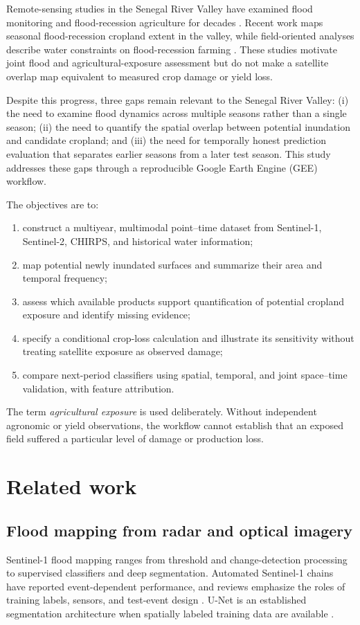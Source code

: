 \documentclass[pdflatex,sn-mathphys,Numbered]{sn-jnl}
\begin{document}
Remote-sensing studies in the Senegal River Valley have examined flood monitoring and flood-recession agriculture for decades \cite{sandholt2003,saarnak2003}. Recent work maps seasonal flood-recession cropland extent in the valley, while field-oriented analyses describe water constraints on flood-recession farming \cite{bruckmann2025,sall2020}. These studies motivate joint flood and agricultural-exposure assessment but do not make a satellite overlap map equivalent to measured crop damage or yield loss.

Despite this progress, three gaps remain relevant to the Senegal River Valley: (i) the need to examine flood dynamics across multiple seasons rather than a single season; (ii) the need to quantify the spatial overlap between potential inundation and candidate cropland; and (iii) the need for temporally honest prediction evaluation that separates earlier seasons from a later test season. This study addresses these gaps through a reproducible Google Earth Engine (GEE) workflow.

The objectives are to:
\begin{enumerate}
  \item construct a multiyear, multimodal point--time dataset from Sentinel-1, Sentinel-2, CHIRPS, and historical water information;
  \item map potential newly inundated surfaces and summarize their area and temporal frequency;
  \item assess which available products support quantification of potential cropland exposure and identify missing evidence;
  \item specify a conditional crop-loss calculation and illustrate its sensitivity without treating satellite exposure as observed damage;
  \item compare next-period classifiers using spatial, temporal, and joint space--time validation, with feature attribution.
\end{enumerate}

The term \emph{agricultural exposure} is used deliberately. Without independent agronomic or yield observations, the workflow cannot establish that an exposed field suffered a particular level of damage or production loss.

\section{Related work}
\subsection{Flood mapping from radar and optical imagery}
Sentinel-1 flood mapping ranges from threshold and change-detection processing to supervised classifiers and deep segmentation. Automated Sentinel-1 chains have reported event-dependent performance, and reviews emphasize the roles of training labels, sensors, and test-event design \cite{twele2016,bioresita2018,bentivoglio2022}. U-Net is an established segmentation architecture when spatially labeled training data are available \cite{ronneberger2015}.
\end{document}
